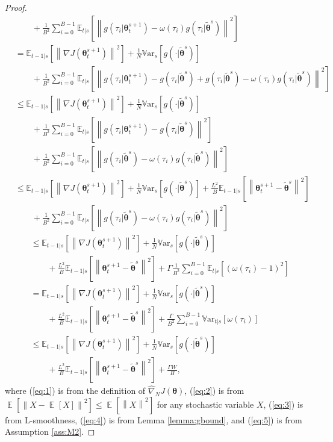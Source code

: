 \documentclass{article}
\theoremstyle{remark}
\theoremstyle{definition}
\DeclareMathOperator*{\EV}{\mathbb{E}}
\newcommand{\EVV}[2][\ppvect \in \ppspace]{\EV_{#1}\left[{#2}\right]}
\newcommand{\norm}[2][\infty]{\left\|#2\right\|_{#1}}
\newcommand{\vtheta}{\boldsymbol{\theta}}
\newcommand{\gradJ}[1]{\nabla J(#1)}
\newcommand{\gradApp}[2]{\widehat{\nabla}_{#2}J(#1)}
\newcommand{\Ets}[2][t]{\mathbb{E}_{#1\vert s}\left[#2\right]}
\newcommand{\Varts}[2][t]{{\mathbb{V}\text{ar}}_{#1\vert s}\left[#2\right]}
\newcommand{\Vars}[1]{{\mathbb{V}\text{ar}}_{s}\left[#1\right]}
\newcommand{\VARIS}{W}
\begin{document}
\begin{proof}
\begin{align}
	&\qquad+
			\frac{1}{B^2}\sum_{i=0}^{B-1}
			\Ets{\norm[]{
			g(\tau_i\vert\vtheta_t^{s+1}) -
			\omega(\tau_i)g(\tau_i\vert\tilde{\vtheta}^s)}^2} \nonumber\\
	&= \Ets[t-1]{\norm[]{\gradJ{\vtheta_t^{s+1}}}^2} 
	+\frac{1}{N}\Vars{g(\cdot\vert\tilde{\vtheta}^s)}
	\nonumber\\
	&\qquad+
			\frac{1}{B^2}\sum_{i=0}^{B-1}
			\Ets{\norm[]{g(\tau_i\vert\vtheta_t^{s+1})
			-g(\tau_i\vert\tilde{\vtheta}^s)
			+g(\tau_i\vert\tilde{\vtheta}^s) 
			-\omega(\tau_i)g(\tau_i\vert\tilde{\vtheta}^s)}^2} \nonumber\\
	&\leq \Ets[t-1]{\norm[]{\gradJ{\vtheta_t^{s+1}}}^2} 
	+\frac{1}{N}\Vars{g(\cdot\vert\tilde{\vtheta}^s)}
	\nonumber\\
	&\qquad+
			\frac{1}{B^2}\sum_{i=0}^{B-1}
			\Ets{\norm[]{g(\tau_i\vert\vtheta_t^{s+1})
			-g(\tau_i\vert\tilde{\vtheta}^s)}^2} \nonumber\\
	&\qquad
			+\frac{1}{B^2}\sum_{i=0}^{B-1}
			\Ets{\norm[]{g(\tau_i\vert\tilde{\vtheta}^s) 
			-\omega(\tau_i)g(\tau_i\vert\tilde{\vtheta}^s)}^2} \nonumber\\
	&\leq \Ets[t-1]{\norm[]{\gradJ{\vtheta_t^{s+1}}}^2} 
	+\frac{1}{N}\Vars{g(\cdot\vert\tilde{\vtheta}^s)}
	+\frac{L^2}{B}\Ets[t-1]{\norm[]{\vtheta_t^{s+1}-\tilde{\vtheta}^s}^2}\nonumber\\
	&\qquad+
		\frac{1}{B^2}\sum_{i=0}^{B-1}
		\Ets{\norm[]{g(\tau_i\vert\tilde{\vtheta}^s) 
			-\omega(\tau_i)g(\tau_i\vert\tilde{\vtheta}^s)}^2} \label{eq:3}
\end{align}
\begin{align}
	&\leq \Ets[t-1]{\norm[]{\gradJ{\vtheta_t^{s+1}}}^2} 
	+\frac{1}{N}\Vars{g(\cdot\vert\tilde{\vtheta}^s)}
	\nonumber\\
	&\qquad+\frac{L^2}{B}\Ets[t-1]{\norm[]{\vtheta_t^{s+1}-\tilde{\vtheta}^s}^2}
	+\Gamma\frac{1}{B^2}\sum_{i=0}^{B-1}\Ets{(\omega(\tau_i)-1)^2} \label{eq:4}\\
	&= \Ets[t-1]{\norm[]{\gradJ{\vtheta_t^{s+1}}}^2} 
	+\frac{1}{N}\Vars{g(\cdot\vert\tilde{\vtheta}^s)}
	\nonumber\\
	&\qquad+\frac{L^2}{B}\Ets[t-1]{\norm[]{\vtheta_t^{s+1}-\tilde{\vtheta}^s}^2}
	+\frac{\Gamma}{B^2}\sum_{i=0}^{B-1}\Varts{\omega(\tau_i)} \nonumber\\
	&\leq \Ets[t-1]{\norm[]{\gradJ{\vtheta_t^{s+1}}}^2} 
	+\frac{1}{N}\Vars{g(\cdot\vert\tilde{\vtheta}^s)}
	\nonumber\\
	&\qquad+\frac{L^2}{B}\Ets[t-1]{\norm[]{\vtheta_t^{s+1}-\tilde{\vtheta}^s}^2}
	+\frac{\Gamma\VARIS}{B}, \label{eq:5}
\end{align}
where (\ref{eq:1}) is from the definition of $\gradApp{\vtheta}{N}$, (\ref{eq:2}) is from $\EVV[]{\norm[]{X-\EVV[]{X}}^2}\leq\EVV[]{\norm[]{X}^2}$ for any stochastic variable $X$, (\ref{eq:3}) is from L-smoothness, 
(\ref{eq:4}) is from Lemma \ref{lemma:gbound}, and (\ref{eq:5}) is from Assumption \ref{ass:M2}.
\end{proof}
\end{document}
